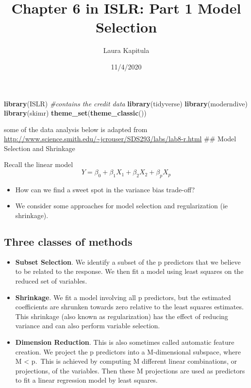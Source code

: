 \documentclass[
]{article}
\title{Chapter 6 in ISLR: Part 1 Model Selection}
\author{Laura Kapitula}
\date{11/4/2020}
\newenvironment{Shaded}{\begin{snugshade}}{\end{snugshade}}
\newcommand{\CommentTok}[1]{\textcolor[rgb]{0.56,0.35,0.01}{\textit{#1}}}
\newcommand{\KeywordTok}[1]{\textcolor[rgb]{0.13,0.29,0.53}{\textbf{#1}}}
\newcommand{\NormalTok}[1]{#1}
\providecommand{\tightlist}{%
  \setlength{\itemsep}{0pt}\setlength{\parskip}{0pt}}
\begin{document}
\maketitle

\begin{Shaded}
\begin{Highlighting}[]
\KeywordTok{library}\NormalTok{(ISLR) }\CommentTok{#contains the credit data}
\KeywordTok{library}\NormalTok{(tidyverse)}
\KeywordTok{library}\NormalTok{(moderndive)}
\KeywordTok{library}\NormalTok{(skimr)}
\KeywordTok{theme_set}\NormalTok{(}\KeywordTok{theme_classic}\NormalTok{())}
\end{Highlighting}
\end{Shaded}

some of the data analysis below is adapted from
\url{http://www.science.smith.edu/~jcrouser/SDS293/labs/lab8-r.html}
\#\# Model Selection and Shrinkage

Recall the linear model
\[Y=\beta_0 + \beta_1X_1+ \beta_2X_2 + \beta_pX_p \]

\begin{itemize}
\tightlist
\item
  How can we find a sweet spot in the variance bias trade-off?
\item
  We consider some approaches for model selection and regularization (ie
  shrinkage).
\end{itemize}

\hypertarget{three-classes-of-methods}{%
\subsection{Three classes of methods}\label{three-classes-of-methods}}

\begin{itemize}
\tightlist
\item
  \textbf{Subset Selection}. We identify a subset of the p predictors
  that we believe to be related to the response. We then fit a model
  using least squares on the reduced set of variables.
\item
  \textbf{Shrinkage}. We fit a model involving all p predictors, but the
  estimated coefficients are shrunken towards zero relative to the least
  squares estimates. This shrinkage (also known as regularization) has
  the effect of reducing variance and can also perform variable
  selection.
\item
  \textbf{Dimension Reduction}. This is also sometimes called automatic
  feature creation. We project the p predictors into a M-dimensional
  subspace, where M \textless{} p.~This is achieved by computing M
  different linear combinations, or projections, of the variables. Then
  these M projections are used as predictors to fit a linear regression
  model by least squares.
\end{itemize}
\end{document}
